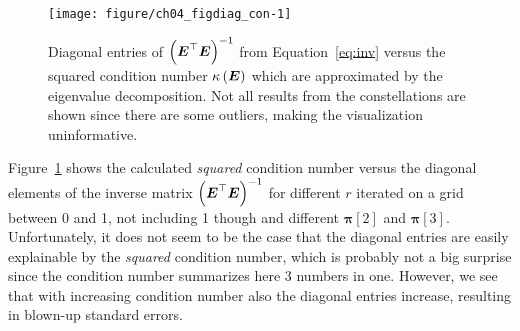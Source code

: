 \documentclass[11pt,a4paper,twoside]{book}\usepackage[]{graphicx}\usepackage[]{xcolor}
\newenvironment{knitrout}{}{} %
\begin{document}
\begin{figure}[h]%
\begin{center}
\begin{knitrout}
\color{fgcolor}
\texttt{[image: figure/ch04\_figdiag\_con-1]} 
\end{knitrout}
\end{center}
\vspace{-1cm}
\caption{Diagonal entries of $\left({\boldsymbol{E}}^\top{\boldsymbol{E}}\right)^{-1}$ from Equation~\eqref{eq:inv} versus the squared condition number $\kappa\left({\boldsymbol{E}}\right)$ which are approximated by the eigenvalue decomposition. Not all results from the constellations are shown since there are some outliers, making the visualization uninformative. }
\label{fig:diag_con}
\end{figure}

Figure~\ref{fig:diag_con} shows the calculated \textit{squared} condition number versus the diagonal elements of the inverse matrix $\left({\boldsymbol{E}}^\top{\boldsymbol{E}}\right)^{-1}$ for different $r$ iterated on a grid between 0 and 1, not including 1 though and different $\boldsymbol{\pi}[2]$ and $\boldsymbol{\pi}[3]$.
Unfortunately, it does not seem to be the case that the diagonal entries are easily explainable by the \textit{squared} condition number, which is probably not a big surprise since the condition number summarizes here 3 numbers in one. However, we see that with increasing condition number also the diagonal entries increase, resulting in blown-up standard errors.

\end{document}
